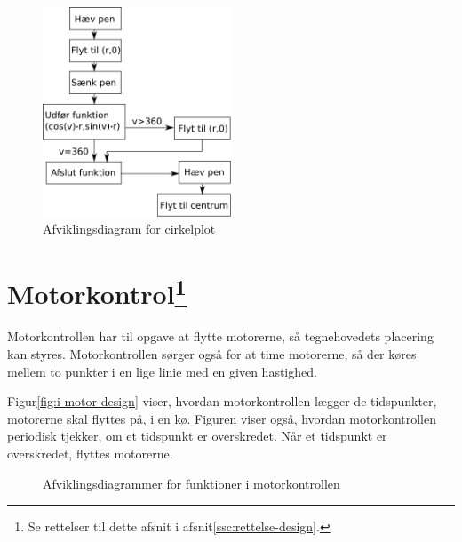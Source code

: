 \begin{figure}[htbp]
  \centering
  \includegraphics[width=0.5\textwidth]{./img/afviklingsdiagram-cirkel}
  \caption{Afviklingsdiagram for cirkelplot}
  \label{fig:hpgl-cirkel-afvikling}
\end{figure}


\section[Motorkontrol (med kø)]{Motorkontrol\footnote{Se rettelser til
    dette afsnit i afsnit\vref{ssc:rettelse-design}.}}




Motorkontrollen har til opgave at flytte motorerne, så tegnehovedets
placering kan styres. Motorkontrollen sørger også for at time
motorerne, så der køres mellem to punkter i en lige linie med en given
hastighed.

Figur\vref{fig:i-motor-design} viser, hvordan motorkontrollen lægger
de tidspunkter, motorerne skal flyttes på, i en kø. Figuren viser
også, hvordan motorkontrollen periodisk tjekker, om et tidspunkt er
overskredet. Når et tidspunkt er overskredet, flyttes motorerne.

\begin{figure}[htbp]
  \centering
  \qquad
  \caption{Afviklingsdiagrammer for funktioner i motorkontrollen}
  \label{fig:i-motor-design}
\end{figure}


